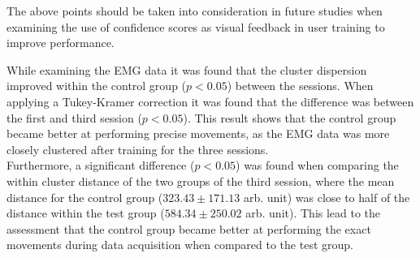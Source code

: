 The above points should be taken into consideration in future studies when examining the use of confidence scores as visual feedback in user training to improve performance. 

While examining the EMG data it was found that the cluster dispersion improved within the control group ($p < 0.05$) between the sessions. When applying a Tukey-Kramer correction it was found that the difference was between the first and third session ($p < 0.05$). %
This result shows that the control group became better at performing precise movements, as the EMG data was more closely clustered after training for the three sessions. \\
Furthermore, a significant difference ($p < 0.05$) was found when comparing the within cluster distance of the two groups of the third session, where the mean distance for the control group ($323.43 \pm 171.13$ arb. unit) was close to half of the distance within the test group ($584.34 \pm 250.02$ arb. unit). This lead to the assessment that the control group became better at performing the exact movements during data acquisition when compared to the test group. %

